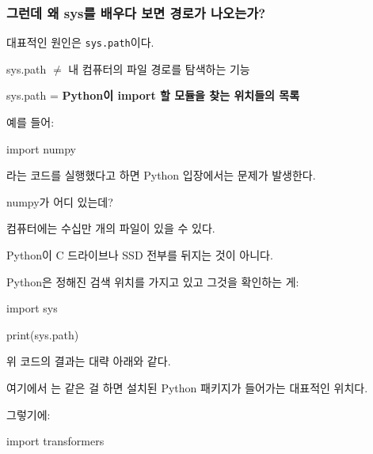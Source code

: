\subsubsection{그런데 왜 sys를 배우다 보면 경로가 나오는가?}

대표적인 원인은 \texttt{sys.path}이다.

\begin{dhknote}
\begin{dhksmry}[centered]
sys.path $\neq$ 내 컴퓨터의 파일 경로를 탐색하는 기능

sys.path = \textbf{Python이 import 할 모듈을 찾는 위치들의 목록}
\end{dhksmry}
\end{dhknote}

예를 들어:

\begin{dhkcode}
import numpy
\end{dhkcode}

라는 코드를 실행했다고 하면 Python 입장에서는 문제가 발생한다.

\begin{dhksmry}[centered]
numpy가 어디 있는데?
\end{dhksmry}

컴퓨터에는 수십만 개의 파일이 있을 수 있다.

Python이 C 드라이브나 SSD 전부를 뒤지는 것이 아니다.

Python은 정해진 검색 위치를 가지고 있고 그것을 확인하는 게:

\begin{dhkcode}
import sys

print(sys.path)
\end{dhkcode}

위 코드의 결과는 대략 아래와 같다.

\begin{dhkzsh}
\end{dhkzsh}

여기에서 는 같은 걸 하면 설치된 Python 패키지가 들어가는 대표적인 위치다.

그렇기에:

\begin{dhkcode}
import transformers
\end{dhkcode}

